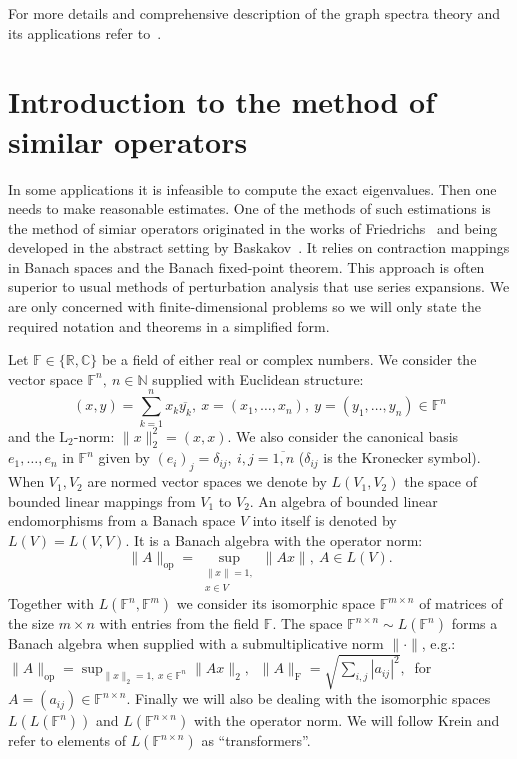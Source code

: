 \documentclass[14pt,a4paper]{extarticle}
\theoremstyle{definition}
\begin{document}
For more details and comprehensive description
    of the graph spectra theory
    and its applications
    refer to~\cite{cvetkovic1980spectra,cvetkovic2010introduction,godsil2013algebraic}.


\section{Introduction to the method of similar operators}

In some applications
    it is infeasible to compute the exact eigenvalues.
Then one needs to make reasonable estimates.
One of the methods of such estimations is the method of simiar operators
originated in the works of Friedrichs~\cite{friedrichs1965advanced} and being developed in
the abstract setting by
Baskakov~\cite{baskakov1986theorem,baskakov1987theorem,baskakov1994spectral,baskakov2002splitting}.
It relies on contraction mappings in Banach spaces
    and the Banach fixed-point theorem.
This approach is often superior to usual methods of perturbation analysis
    that use series expansions.
We are only concerned with finite-dimensional problems
    so we will only state the required notation and theorems
    in a simplified form.

Let \( \mathbb{F}\in \{ \mathbb{R}, \mathbb{C} \} \)
    be a field of either real or complex numbers.
We consider the vector space \( \mathbb{F}^n,\ n\in \mathbb{N} \)
    supplied with Euclidean structure:
    \[
        (x, y){=}\sum_{k=1}^n x_k\overline{y_k},
        \ x{=}(x_1,\ldots, x_n),
        \ y=(y_1,\ldots, y_n)
        \in \mathbb{F}^n
        \]
    and the \( \mathrm{L}_2 \)-norm:
    \(
        \|x\|_2^2{=}(x,x).
        \)
We also consider the canonical basis \( e_1, \ldots, e_n \)
    in \( \mathbb{F}^n \) given by
    \( {(e_i)}_j = \delta_{ij},\ i,j=\overline{1,n} \)
    (\(\delta_{ij} \) is the Kronecker symbol).
When \( V_1, V_2 \) are normed vector spaces
    we denote by \( L(V_1, V_2) \)
    the space of bounded linear mappings
    from \( V_1 \) to \( V_2 \).
An algebra of bounded linear endomorphisms
    from a Banach space \( V \)
    into itself
    is denoted by \( L(V) = L(V, V) \).
It is a Banach algebra with the operator norm:
    \[
        \|A\|_{\mathrm{op}} =
        \sup_{
            \substack{\|x\|=1,\\ x\in V}
        } \|A x\|,\ A\in L(V).
        \]
Together with \( L(\mathbb{F}^n, \mathbb{F}^m) \)
    we consider its isomorphic space \( \mathbb{F}^{m{\times}n} \)
    of matrices of the size \( m{\times}n \)
    with entries from the field \( \mathbb{F} \).
The space \( \mathbb{F}^{n{\times}n}\sim L(\mathbb{F}^n) \)
    forms a Banach algebra
    when supplied with a submultiplicative norm
    \( \|\cdot\| \),
    e.g.: \( \|A\|_{\mathrm{op}} = \sup_{\|x\|_2=1,\ x\in \mathbb{F}^n} \|A x\|_2,\ \)
    \( \|A\|_{\mathrm{F}} = \sqrt{\sum_{i,j} |a_{ij}|^2},\ \)
    for 
    \( A{=}(a_{ij})\in\mathbb{F}^{n\times n} \).
Finally we will also be dealing with the isomorphic spaces
    \( L(L(\mathbb{F}^n)) \) and \( L(\mathbb{F}^{n{\times}n}) \)
    with the operator norm.
We will follow Krein
    and refer to elements of \( L(\mathbb{F}^{n{\times}n}) \)
    as ``transformers''.
\end{document}
